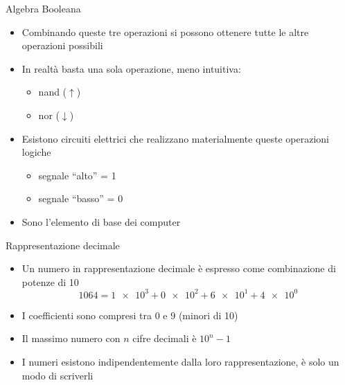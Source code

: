 \documentclass[xcolor=dvipsnames,handout]{beamer}
\begin{document}
\begin{frame}{Algebra Booleana}
  \vfill
  \begin{itemize}
    \item Combinando queste tre operazioni si possono ottenere tutte le altre
    operazioni possibili
    \vfill
    \item In realtà basta \alert{una} sola operazione, meno intuitiva:
    \begin{itemize}
      \item nand (\(\uparrow\))
      \item nor (\(\downarrow\))
    \end{itemize}
    \vfill
    \item Esistono circuiti \alert{elettrici} che realizzano materialmente queste
    operazioni logiche
    \begin{itemize}
      \item segnale ``alto'' = 1
      \item segnale ``basso'' = 0
    \end{itemize}
    \vfill
    \item Sono l'elemento di base dei computer
  \end{itemize}
  \vfill
\end{frame}

\begin{frame}{Rappresentazione decimale}
  \vfill
  \begin{itemize}
    \item Un numero in rappresentazione \alert{decimale} è espresso come combinazione
    di potenze di 10
    \[\num{1064} = \num{1e3} + \num{0e2} + \num{6e1} + \num{4e0}\]
    \item I coefficienti sono compresi tra 0 e 9 (\alert{minori} di 10)
    \vfill
    \item Il massimo numero con \(n\) cifre decimali è \(10^n - 1\)
    \vfill
    \item I numeri esistono indipendentemente dalla loro rappresentazione, è solo
    un modo di scriverli
  \end{itemize}
  \vfill
\end{frame}
\end{document}
